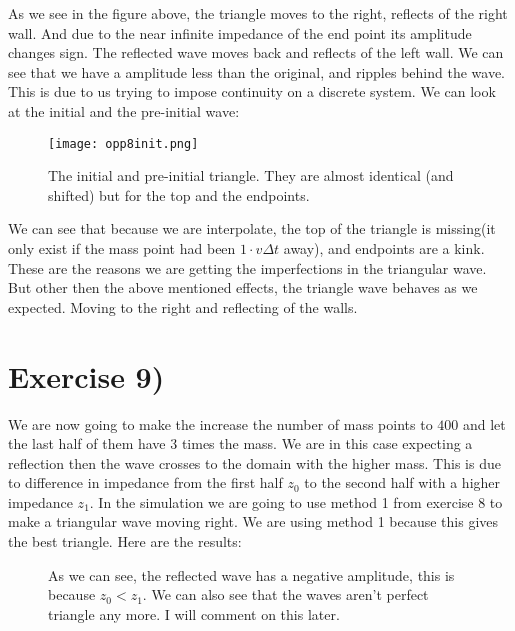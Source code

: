 \documentclass[a4paper,norsk, 10pt]{article}
\begin{document}
As we see in the figure above, the triangle moves to the right, reflects of the right wall. And due to the near infinite impedance of the end point its amplitude changes sign. The reflected wave moves back and reflects of the left wall. We can see that we have a amplitude less than the original, and ripples behind the wave. This is due to us trying to impose continuity on a discrete system. We can look at the initial and the pre-initial wave:

\begin{figure}[H]
\centering
\texttt{[image: opp8init.png]}
\caption{The initial and pre-initial triangle. They are almost identical (and shifted) but for the top and the endpoints.}
\end{figure}

We can see that because we are interpolate, the top of the triangle is missing(it only exist if the mass point had been $1\cdot v\Delta t$ away), and endpoints are a kink. These are the reasons we are getting the imperfections in the triangular wave.\\

But other then the above mentioned effects, the triangle wave behaves as we expected. Moving to the right and reflecting of the walls.


\section{Exercise 9)}

We are now going to make the increase the number of mass points to $400$ and let the last half of them have 3 times the mass. We are in this case expecting a reflection then the wave crosses to the domain with the higher mass. This is due to difference in impedance from the first half $z_0$ to the second half with a higher impedance $z_1$. In the simulation we are going to use method 1 from exercise 8 to make a triangular wave moving right. We are using method 1 because this gives the best triangle. Here are the results:


\begin{figure}[H]
\captionsetup[subfigure]{position=b}
\centering
{}
\caption{As we can see, the reflected wave has a negative amplitude, this is because $z_0 < z_1$. We can also see that the waves aren't perfect triangle any more. I will comment on this later.}
\end{figure}
\end{document}
